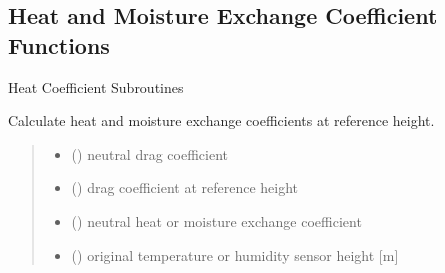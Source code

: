 \documentclass[letterpaper,10pt,english]{sphinxmanual}
\begin{document}
\subsection{Heat and Moisture Exchange Coefficient Functions}
\label{\detokenize{users_guide:module-AirSeaFluxCode.flux_subs.heat_coef}}\label{\detokenize{users_guide:heat-and-moisture-exchange-coefficient-functions}}
\sphinxAtStartPar
Heat Coefficient Sub\sphinxhyphen{}routines

\begin{fulllineitems}
\label{\detokenize{users_guide:AirSeaFluxCode.flux_subs.heat_coef.ctq_calc}}
\pysigstartsignatures
\pysiglinewithargsret
{}
{\sphinxparamcomma {}\sphinxparamcomma {}\sphinxparamcomma {}\sphinxparamcomma {}\sphinxparamcomma {}}
{}
\pysigstopsignatures
\sphinxAtStartPar
Calculate heat and moisture exchange coefficients at reference height.
\begin{quote}\begin{description}
\begin{itemize}
\item {}
\sphinxAtStartPar
{} () \textendash{} neutral drag coefficient

\item {}
\sphinxAtStartPar
{} () \textendash{} drag coefficient at reference height

\item {}
\sphinxAtStartPar
{} () \textendash{} neutral heat or moisture exchange coefficient

\item {}
\sphinxAtStartPar
{} () \textendash{} original temperature or humidity sensor height {[}m{]}


\end{itemize}
\end{description}
\end{quote}
\end{fulllineitems}
\end{document}
